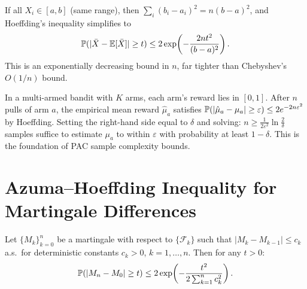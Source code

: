 \documentclass[11pt,a4paper]{article}
\begin{document}
\begin{remark}
If all $X_i \in [a, b]$ (same range), then
$\sum_i (b_i - a_i)^2 = n(b - a)^2$, and Hoeffding's inequality
simplifies to
\begin{equation}
  \mathbb{P}(|\bar{X} - \mathbb{E}[\bar{X}]| \geq t)
  \leq 2\exp\!\left(-\frac{2nt^2}{(b-a)^2}\right).
  \label{eq:hoeffding_simple}
\end{equation}
This is an exponentially decreasing bound in $n$, far tighter
than Chebyshev's $O(1/n)$ bound.
\end{remark}

\begin{rlconnection}[title={Connection to RL: Sample Complexity}]
In a multi-armed bandit with $K$ arms, each arm's reward lies in
$[0,1]$.  After $n$ pulls of arm $a$, the empirical mean reward
$\hat{\mu}_a$ satisfies
$\mathbb{P}(|\hat{\mu}_a - \mu_a| \geq \varepsilon)
\leq 2e^{-2n\varepsilon^2}$ by Hoeffding.
Setting the right-hand side equal to $\delta$ and solving:
$n \geq \frac{1}{2\varepsilon^2}\ln\frac{2}{\delta}$
samples suffice to estimate $\mu_a$ to within $\varepsilon$ with
probability at least $1 - \delta$.  This is the foundation of PAC
sample complexity bounds.
\end{rlconnection}


\section{Azuma--Hoeffding Inequality for Martingale Differences}
\label{sec:azuma}

\begin{keyresult}[title={Azuma--Hoeffding Inequality}]
\begin{theorem}
\label{thm:azuma}
Let $\{M_k\}_{k=0}^n$ be a martingale with respect to
$\{\mathcal{F}_k\}$ such that
$|M_k - M_{k-1}| \leq c_k$ a.s.\ for deterministic constants
$c_k > 0$, $k = 1, \ldots, n$.  Then for any $t > 0$:
\begin{equation}
  \mathbb{P}(|M_n - M_0| \geq t)
  \leq 2\exp\!\left(
    -\frac{t^2}{2\sum_{k=1}^n c_k^2}\right).
  \label{eq:azuma}
\end{equation}
\end{theorem}
\end{keyresult}
\end{document}
